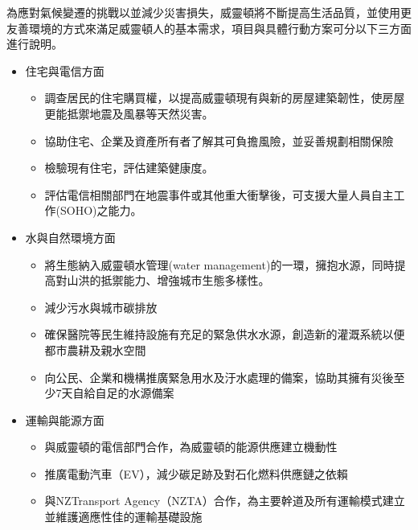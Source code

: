 \documentclass[a4paper,12pt]{article}
\begin{document}
\begin{enumerate}
\begin{enumerate}
\begin{enumerate}
為應對氣候變遷的挑戰以並減少災害損失，威靈頓將不斷提高生活品質，並使用更友善環境的方式來滿足威靈頓人的基本需求，項目與具體行動方案可分以下三方面進行說明。\\
\begin{itemize}
\item 住宅與電信方面
\label{sec:org779c05e}
\begin{itemize}
\item 調查居民的住宅購買權，以提高威靈頓現有與新的房屋建築韌性，使房屋更能抵禦地震及風暴等天然災害。\\
\item 協助住宅、企業及資產所有者了解其可負擔風險，並妥善規劃相關保險\\
\item 檢驗現有住宅，評估建築健康度。\\
\item 評估電信相關部門在地震事件或其他重大衝擊後，可支援大量人員自主工作(SOHO)之能力。\\
\end{itemize}
\item 水與自然環境方面
\label{sec:orgf239293}
\begin{itemize}
\item 將生態納入威靈頓水管理(water management)的一環，擁抱水源，同時提高對山洪的抵禦能力、增強城市生態多樣性。\\
\item 減少污水與城市碳排放\\
\item 確保醫院等民生維持設施有充足的緊急供水水源，創造新的灌溉系統以便都市農耕及親水空間\\
\item 向公民、企業和機構推廣緊急用水及汙水處理的備案，協助其擁有災後至少7天自給自足的水源備案\\
\end{itemize}
\item 運輸與能源方面
\label{sec:org7736795}
\begin{itemize}
\item 與威靈頓的電信部門合作，為威靈頓的能源供應建立機動性\\
\item 推廣電動汽車（EV），減少碳足跡及對石化燃料供應鏈之依賴\\
\item 與NZTransport Agency（NZTA）合作，為主要幹道及所有運輸模式建立並維護適應性佳的運輸基礎設施\\
\end{itemize}
\end{itemize}
\end{enumerate}


\end{enumerate}
\end{enumerate}
\end{document}
